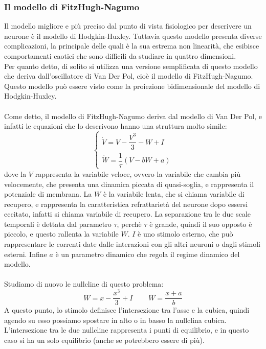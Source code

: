 \documentclass[12pt]{article}
\begin{document}
\subsubsection{Il modello di FitzHugh-Nagumo}
Il modello migliore e più preciso dal punto di vista fisiologico per descrivere un neurone è il modello di Hodgkin-Huxley. Tuttavia questo modello presenta diverse complicazioni, la principale delle quali è la sua estrema non linearità, che esibisce comportamenti caotici che sono difficili da studiare in quattro dimensioni. \\
Per quanto detto, di solito si utilizza una versione semplificata di questo modello che deriva dall'oscillatore di Van Der Pol, cioè il modello di FitzHugh-Nagumo. Questo modello può essere visto come la proiezione bidimensionale del modello di Hodgkin-Huxley. \\ \\
Come detto, il modello di FitzHugh-Nagumo deriva dal modello di Van Der Pol, e infatti le equazioni che lo descrivono hanno una struttura molto simile:
\begin{equation}
	\begin{cases}
		\dot{V} = V - \dfrac{V^3}{3} - W + I \\
		\dot{W} = \dfrac{1}{\tau} \left(V -bW + a\right) 
	\end{cases}
\end{equation}
dove la $V$ rappresenta la variabile veloce, ovvero la variabile che cambia più velocemente, che presenta una dinamica piccata di quasi-soglia, e rappresenta il potenziale di membrana. La $W$ è la variabile lenta, che si chiama variabile di recupero, e rappresenta la caratteristica refrattarietà del neurone dopo essersi eccitato, infatti si chiama variabile di recupero. La separazione tra le due scale temporali è dettata dal parametro $\tau$, perchè $\tau$ è grande, quindi il suo opposto è piccolo, e questo rallenta la variabile $W$. $I$ è uno stimolo esterno, che può rappresentare le correnti date dalle interazioni con gli altri neuroni o dagli stimoli esterni. Infine $a$ è un parametro dinamico che regola il regime dinamico del modello. \\ \\
Studiamo di nuovo le nullcline di questo problema:
$$
	W = x - \frac{x^3}{3} + I \ \ \ \ \ \ \ \ \ \ W = \frac{x+a}{b}
$$
A questo punto, lo stimolo definisce l'intersezione tra l'asse e la cubica, quindi agendo su esso possiamo spostare in alto o in basso la nullclina cubica. \\
L'intersezione tra le due nullcline rappresenta i punti di equilibrio, e in questo caso si ha un solo equilibrio (anche se potrebbero essere di più). 
\end{document}
